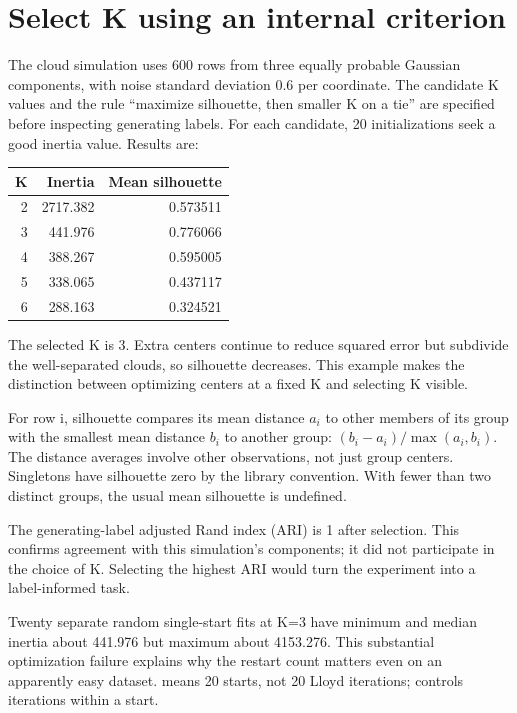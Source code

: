 \section{Select K using an internal criterion}
The cloud simulation uses 600 rows from three equally probable Gaussian components, with noise standard deviation 0.6 per coordinate.
The candidate K values and the rule ``maximize silhouette, then smaller K on a tie'' are specified before inspecting generating labels.
For each candidate, 20 initializations seek a good inertia value. Results are:
\begin{center}\begin{tabular}{rrr}\toprule
K&Inertia&Mean silhouette\\\midrule
2&2717.382&0.573511\\3&441.976&0.776066\\4&388.267&0.595005\\
5&338.065&0.437117\\6&288.163&0.324521\\\bottomrule\end{tabular}\end{center}
The selected K is 3. Extra centers continue to reduce squared error but subdivide the well-separated clouds,
so silhouette decreases. This example makes the distinction between optimizing centers at a fixed K and selecting K visible.

For row i, silhouette compares its mean distance $a_i$ to other members of its group with the smallest mean distance $b_i$
to another group: $(b_i-a_i)/\max(a_i,b_i)$. The distance averages involve other observations, not just group centers.
Singletons have silhouette zero by the library convention. With fewer than two distinct groups, the usual mean silhouette is undefined.

The generating-label adjusted Rand index (ARI) is 1 after selection. This confirms agreement with this simulation's components;
it did not participate in the choice of K. Selecting the highest ARI would turn the experiment into a label-informed task.

Twenty separate random single-start fits at K=3 have minimum and median inertia about 441.976 but maximum about 4153.276.
This substantial optimization failure explains why the restart count matters even on an apparently easy dataset.
 means 20 starts, not 20 Lloyd iterations;  controls iterations within a start.


